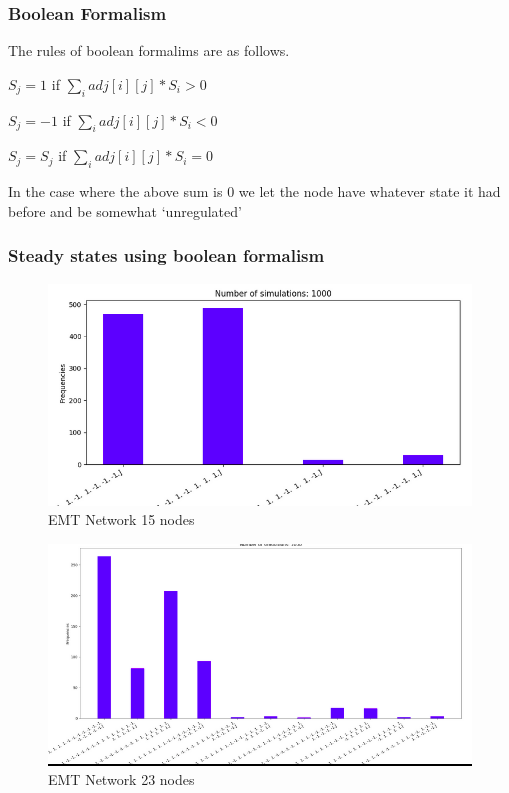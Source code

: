 \documentclass[t]{beamer}
\begin{document}
\begin{frame}
	\frametitle{Boolean Formalism}
	The rules of boolean formalims are as follows. 
	
	\begin{item}
\item $ S_j = 1 $ if    $  \sum_{ i } ^ { } adj[i][j] * S_i> 0 $ 

	\item $ S_j = -1 $ if    $  \sum_{ i } ^ { } adj[i][j] * S_i< 0 $

	\item $ S_j = S_j  $ if   $  \sum_{ i } ^ { } adj[i][j] * S_i= 0$ 
	\item In the case where the above sum is 0 we let the node have whatever state it had before and be somewhat `unregulated'	
	\end{item}
\end{frame}


\begin{frame}
	\frametitle{Steady states using boolean formalism}
	\begin{figure}[H]
	
		\includegraphics[scale=0.3]{img/emtracipebool.png}
		\caption{EMT Network 15 nodes}
	\end{figure}
\end{frame}

\begin{frame}
\begin{figure}[H]
	\includegraphics[scale=0.3]{img/emtracipe2bool.png}
	\caption{EMT Network 23 nodes}
\end{figure}
\end{frame}
\end{document}
